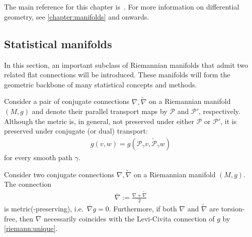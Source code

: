 \chapter{}\label{chapter:info}

    The main reference for this chapter is~\citet{amari_information_2016}. For more information on differential geometry, see \cref{chapter:manifolds} and onwards.

    \minitoc

\section{Statistical manifolds}

    In this section, an important subclass of Riemannian manifolds that admit two related flat connections will be introduced. These manifolds will form the geometric backbone of many statistical concepts and methods.

    \begin{property}
        Consider a pair of conjugate connections $\nabla,\widetilde{\nabla}$ on a Riemannian manifold $(M,g)$ and denote their parallel transport maps by $\mathcal{P}$ and $\mathcal{P}'$, respectively. Although the metric is, in general, not preserved under either $\mathcal{P}$ or $\mathcal{P}'$, it is preserved under conjugate (or dual) transport:
        \begin{gather}
            g(v,w) = g\left(\mathcal{P}_\gamma v,\widetilde{\mathcal{P}}_\gamma w\right)
        \end{gather}
        for every smooth path $\gamma$.
    \end{property}

    \begin{property}
        Consider two conjugate connections $\nabla,\widetilde{\nabla}$ on a Riemannian manifold $(M,g)$. The connection
        \begin{gather}
            \overline{\nabla} := \frac{\nabla+\widetilde{\nabla}}{2}
        \end{gather}
        is metric(-preserving), i.e.~$\overline{\nabla}g=0$. Furthermore, if both $\nabla$ and $\widetilde{\nabla}$ are torsion-free, then $\overline{\nabla}$ necessarily coincides with the Levi-Civita connection of $g$ by \cref{riemann:unique}.
    \end{property}

